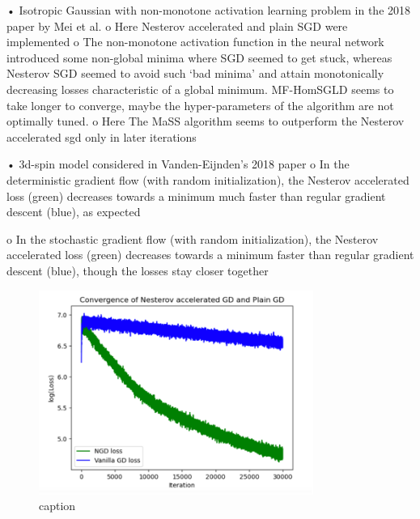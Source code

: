 \documentclass{article}
\begin{document}
•	Isotropic Gaussian with non-monotone activation learning problem in the 2018 paper by Mei et al.
o	Here Nesterov accelerated and plain SGD were implemented
o	The non-monotone activation function in the neural network introduced some non-global minima where SGD seemed to get stuck, whereas Nesterov SGD seemed to avoid such ‘bad minima’ and attain monotonically decreasing losses characteristic of a global minimum. MF-HomSGLD seems to take longer to converge, maybe the hyper-parameters of the algorithm are not optimally tuned.
o	Here The MaSS algorithm seems to outperform the Nesterov accelerated sgd only in later iterations
 
 
•	3d-spin model considered in Vanden-Eijnden’s 2018 paper
o	In the deterministic gradient flow (with random initialization), the Nesterov accelerated loss (green) decreases  towards a minimum much faster than regular gradient descent (blue), as expected
 
o	In the stochastic gradient flow (with random initialization), the Nesterov accelerated loss (green) decreases  towards a minimum faster than regular gradient descent (blue), though the losses stay closer together
\begin{figure}[H]
  \centering
  \includegraphics[width=0.8\textwidth]{images/Eijnden2018-SGD-algos-risk-3dspin.png}
  \caption{ caption}
  \label{fig: description}
\end{figure}%
 
\end{document}
